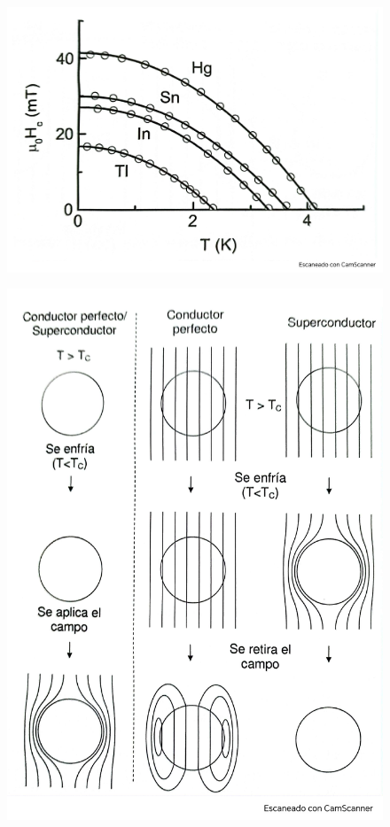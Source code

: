 \begin{figure}[h!] \centering
	\includegraphics[scale=0.5]{Cuerpo/Ch_11/Fotos libro 3.pdf}
	\caption{}
	\label{Fig:11-03}
\end{figure}
\begin{figure}[h!] \centering
	\includegraphics[scale=0.5]{Cuerpo/Ch_11/Fotos libro 4.pdf}
	\caption{}
	\label{Fig:11-04}
\end{figure}
